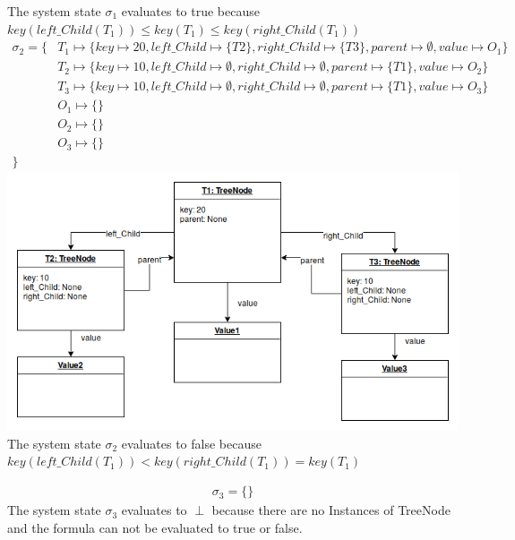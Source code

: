 \documentclass{scrartcl}
\begin{document}
\begin{itemize}
        The system state $\sigma_{1}$ evaluates to true because $key(left\_Child(T_{1})) \leq key(T_{1}) \leq
        key(right\_Child(T_{1}))$
        \newpage
        \begin{align*}
        \sigma_{2} = \{
        &T_{1}\mapsto \{key\mapsto 20,
        left\_Child \mapsto \{T2\},
        right\_Child \mapsto \{T3\},
        parent \mapsto \emptyset,
        value \mapsto O_1
        \}\\
        &T_{2}\mapsto \{key\mapsto 10,
        left\_Child \mapsto \emptyset,
        right\_Child \mapsto \emptyset,
        parent \mapsto \{T1\},
        value \mapsto O_2
        \}\\
        &T_{3}\mapsto \{key\mapsto 10,
        left\_Child \mapsto \emptyset,
        right\_Child \mapsto \emptyset,
        parent \mapsto \{T1\},
        value \mapsto O_3
        \}\\
        &O_1\mapsto \{\}\\
        &O_2\mapsto \{\}\\
        &O_3\mapsto \{\}\\
        \}
        \end{align*}
        \includegraphics*[scale=0.5]{1b.png}\\
        The system state $\sigma_{2}$ evaluates to false because \\ $key(left\_Child(T_{1})) < key(right\_Child(T_{1})) = key(T_{1})$

        \begin{align*}
        \sigma_{3} = \{\}
        \end{align*}
        The system state $\sigma_{3}$ evaluates to $\perp$ because there are no Instances of TreeNode and the formula can not be evaluated to true or false.


\end{itemize}
\end{document}

